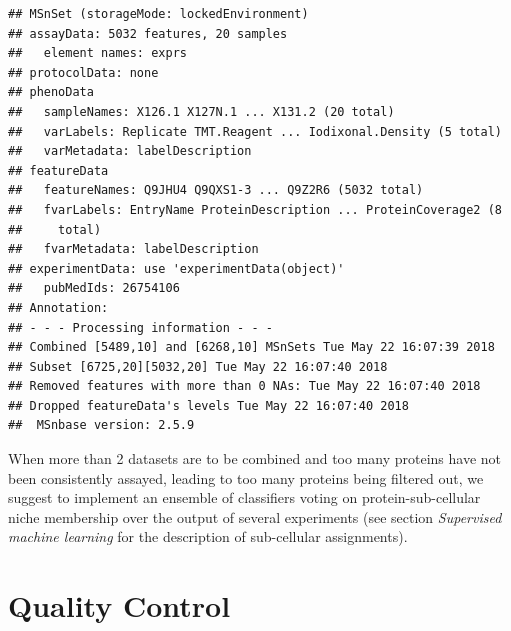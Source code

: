 \begin{knitrout}
\color{fgcolor}\begin{kframe}
\begin{alltt}
 \hlkwb{<-} 
\end{alltt}
\begin{verbatim}
## MSnSet (storageMode: lockedEnvironment)
## assayData: 5032 features, 20 samples 
##   element names: exprs 
## protocolData: none
## phenoData
##   sampleNames: X126.1 X127N.1 ... X131.2 (20 total)
##   varLabels: Replicate TMT.Reagent ... Iodixonal.Density (5 total)
##   varMetadata: labelDescription
## featureData
##   featureNames: Q9JHU4 Q9QXS1-3 ... Q9Z2R6 (5032 total)
##   fvarLabels: EntryName ProteinDescription ... ProteinCoverage2 (8
##     total)
##   fvarMetadata: labelDescription
## experimentData: use 'experimentData(object)'
##   pubMedIds: 26754106 
## Annotation:  
## - - - Processing information - - -
## Combined [5489,10] and [6268,10] MSnSets Tue May 22 16:07:39 2018 
## Subset [6725,20][5032,20] Tue May 22 16:07:40 2018 
## Removed features with more than 0 NAs: Tue May 22 16:07:40 2018 
## Dropped featureData's levels Tue May 22 16:07:40 2018 
##  MSnbase version: 2.5.9
\end{verbatim}
\end{kframe}
\end{knitrout}

When more than 2 datasets are to be combined and too many proteins
have not been consistently assayed, leading to too many proteins being
filtered out, we suggest to implement an ensemble of classifiers
voting on protein-sub-cellular niche membership over the output of
several experiments (see section \textit{Supervised machine learning}
for the description of sub-cellular assignments).

\section*{Quality Control}


